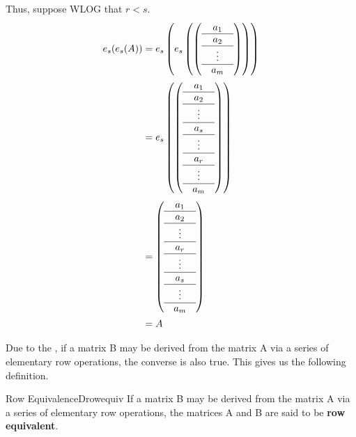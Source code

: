 \documentclass[oneside]{book}
\begin{document}
\begin{pr}
\begin{itemize}
		Thus, suppose WLOG that $r < s$.
		\begin{align*}
			e_s(e_s(A)) & = e_s\left(e_s\left(\left(
			\begin{array}{@{}ccc@{}}
				& a_{1} & \\ \hline
				& a_{2} & \\ \hline
				& \vdots & \\ \hline
				& a_{m} & \\
			\end{array}
		\right)\right)\right) \\
		& = e_s\left(\left(
		\begin{array}{@{}ccc@{}}
			& a_{1} & \\ \hline
			& a_{2} & \\ \hline
			& \vdots & \\ \hline
			& a_{s} & \\ \hline
			& \vdots & \\ \hline
			& a_{r} & \\ \hline
			& \vdots & \\ \hline
			& a_{m} & \\
		\end{array}
		\right)\right) \\
		& = \left(\begin{array}{@{}ccc@{}}
			& a_{1} & \\ \hline
			& a_{2} & \\ \hline
			& \vdots & \\ \hline
			& a_{r} & \\ \hline
			& \vdots & \\ \hline
			& a_{s} & \\ \hline
			& \vdots & \\ \hline
			& a_{m} & \\
		\end{array}\right) \\
		& = A
		\end{align*}
		\end{itemize}
	\end{pr}

	Due to the , if a matrix B may be derived from the matrix A via a series of elementary row operations, the converse is also true. This gives us the following definition.
	\begin{defn}{Row Equivalence}{Drowequiv}
		If a matrix B may be derived from the matrix A via a series of elementary row operations, the matrices A and B are said to be \textbf{row equivalent}.
	\end{defn}

	
	 
\end{document}
